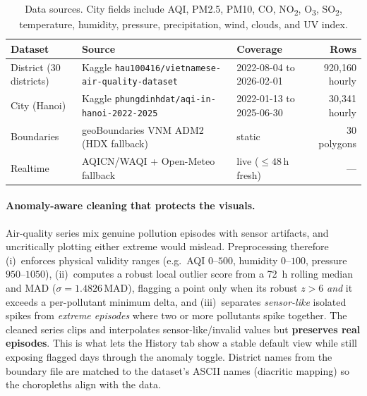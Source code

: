 \documentclass[a4paper]{article}
\begin{document}
\begin{table}[h]
\centering
\small
\begin{tabular}{@{}lllr@{}}
\toprule
Dataset & Source & Coverage & Rows \\
\midrule
District (30 districts) & Kaggle \texttt{hau100416/vietnamese-air-quality-dataset} & 2022-08-04 to 2026-02-01 & 920{,}160 hourly \\
City (Hanoi) & Kaggle \texttt{phungdinhdat/aqi-in-hanoi-2022-2025} & 2022-01-13 to 2025-06-30 & 30{,}341 hourly \\
Boundaries & geoBoundaries VNM ADM2 (HDX fallback) & static & 30 polygons \\
Realtime & AQICN/WAQI + Open-Meteo fallback & live ($\le 48$\,h fresh) & --- \\
\bottomrule
\end{tabular}
\caption{Data sources. City fields include AQI, PM2.5, PM10, CO, NO\textsubscript{2}, O\textsubscript{3},
SO\textsubscript{2}, temperature, humidity, pressure, precipitation, wind, clouds, and UV index.}
\label{tab:data}
\end{table}

\paragraph{Anomaly-aware cleaning that protects the visuals.}
Air-quality series mix genuine pollution episodes with sensor artifacts, and uncritically plotting either
extreme would mislead. Preprocessing therefore (i)~enforces physical validity ranges (e.g.\ AQI
$0$--$500$, humidity $0$--$100$, pressure $950$--$1050$), (ii)~computes a robust local outlier score from a
72~h rolling median and MAD ($\sigma = 1.4826\,\text{MAD}$), flagging a point only when its robust
$z>6$ \emph{and} it exceeds a per-pollutant minimum delta, and (iii)~separates \emph{sensor-like} isolated
spikes from \emph{extreme episodes} where two or more pollutants spike together. The cleaned series clips
and interpolates sensor-like/invalid values but \textbf{preserves real episodes}. This is what lets the
History tab show a stable default view while still exposing flagged days through the anomaly toggle.
District names from the boundary file are matched to the dataset's ASCII names (diacritic mapping) so the
choropleths align with the data.

\end{document}
